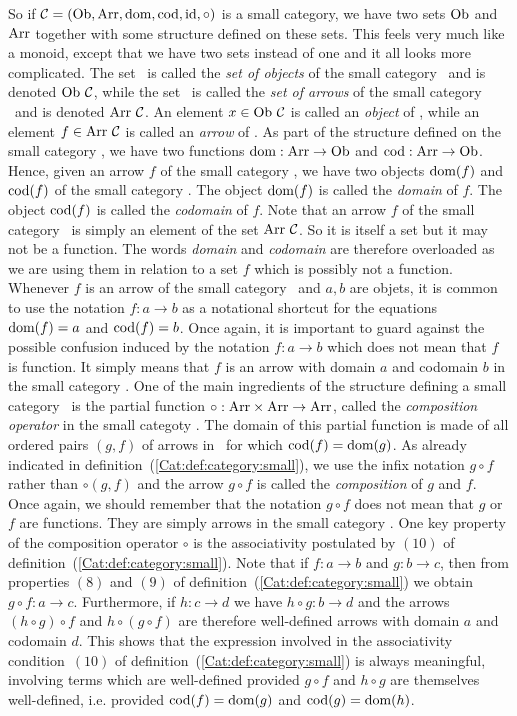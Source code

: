 So if $\mbox{$\cal C$}=(\mbox{\rm Ob}, \mbox{\rm Arr}, \mbox{\rm dom}, \mbox{\rm cod}, \mbox{\rm id}, \circ)$ is a small category, we have
two sets $\mbox{\rm Ob}$ and $\mbox{\rm Arr}$ together with some structure defined on these sets.
This feels very much like a monoid, except that we have two sets instead of one
and it all looks more complicated. The set \ob\ is called the {\em set of 
objects} of the small category \Cat\ and is denoted $\mbox{\rm Ob}\ \mbox{$\cal C$}$, while the set 
\arr\ is called the {\em set of arrows} of the small category \Cat\ and is 
denoted $\mbox{\rm Arr}\ \mbox{$\cal C$}$. An element $x\in\mbox{\rm Ob}\ \mbox{$\cal C$}$ is called an {\em object} 
of \Cat, while an element $f\in\mbox{\rm Arr}\ \mbox{$\cal C$}$ is called an {\em arrow} of \Cat.
As part of the structure defined on the small category \Cat, we have two
functions $\mbox{\rm dom}:\mbox{\rm Arr}\to\mbox{\rm Ob}$ and $\mbox{\rm cod}:\mbox{\rm Arr}\to\mbox{\rm Ob}$. Hence, given an arrow $f$
of the small category \Cat, we have two objects $\mbox{\rm dom}(f)$ and $\mbox{\rm cod}(f)$ of the
small category \Cat. The object $\mbox{\rm dom}(f)$ is called the {\em domain} of $f$. 
The object $\mbox{\rm cod}(f)$ is called the {\em codomain} of $f$. Note that an arrow $f$ 
of the small category \Cat\ is simply an element of the set $\mbox{\rm Arr}\ \mbox{$\cal C$}$. So it 
is itself a set but it may not be a function. The words {\em domain} and 
{\em codomain} are therefore overloaded as we are using them in relation to a 
set $f$ which is possibly not a function. Whenever $f$ is an arrow of the small 
category  \Cat\ and $a,b$ are objets, it is common to use the notation $f:a\to b$ 
as a notational shortcut for the equations $\mbox{\rm dom}(f)=a$ and $\mbox{\rm cod}(f)=b$. Once
again, it is important to guard against the possible confusion induced 
by the notation $f:a\to b$ which does not mean that $f$ is function. It 
simply means that $f$ is an arrow with domain $a$ and codomain $b$ in the 
small category \Cat. One of the main ingredients of the structure defining
a small category \Cat\ is the partial function $\circ:\mbox{\rm Arr}\times\mbox{\rm Arr}\to\mbox{\rm Arr}$,
called the {\em composition operator} in the small categoty \Cat. The domain
of this partial function is made of all ordered pairs $(g,f)$ of arrows in
\Cat\ for which $\mbox{\rm cod}(f)=\mbox{\rm dom}(g)$. As already indicated in 
definition~(\ref{Cat:def:category:small}), we use the infix notation $g\circ f$
rather than $\circ(g,f)$ and the arrow $g\circ f$ is called the {\em composition}
of $g$ and $f$. Once again, we should remember that the notation $g\circ f$ does
not mean that $g$ or $f$ are functions. They are simply arrows in the small
category \Cat. One key property of the composition operator $\circ$ is the 
associativity postulated by $(10)$ of definition~(\ref{Cat:def:category:small}).
Note that if $f:a\to b$ and $g:b\to c$, then from properties $(8)$ and $(9)$ of
definition~(\ref{Cat:def:category:small}) we obtain $g\circ f:a\to c$. 
Furthermore, if $h:c\to d$ we have $h\circ g:b\to d$ and the arrows 
$(h\circ g)\circ f$ and $h\circ(g\circ f)$ are therefore well-defined arrows
with domain $a$ and codomain $d$. This shows that the expression involved
in the associativity condition~$(10)$ of definition~(\ref{Cat:def:category:small})
is always meaningful, involving terms which are well-defined provided
$g\circ f$ and $h\circ g$ are themselves well-defined, i.e. provided
$\mbox{\rm cod}(f)=\mbox{\rm dom}(g)$ and $\mbox{\rm cod}(g)=\mbox{\rm dom}(h)$. 

